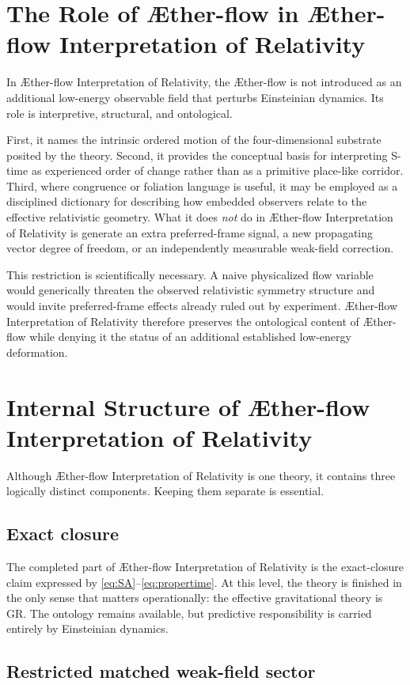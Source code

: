 \documentclass[11pt]{article}
\newcommand{\Aflow}{\AE{}ther-flow}
\newcommand{\TheoryName}{\Aflow{} Interpretation of Relativity}
\begin{document}
\section{The Role of \Aflow{} in \TheoryName{}}

In \TheoryName{}, the \Aflow{} is not introduced as an additional low-energy observable field that perturbs Einsteinian dynamics. Its role is interpretive, structural, and ontological.

First, it names the intrinsic ordered motion of the four-dimensional substrate posited by the theory. Second, it provides the conceptual basis for interpreting S-time as experienced order of change rather than as a primitive place-like corridor. Third, where congruence or foliation language is useful, it may be employed as a disciplined dictionary for describing how embedded observers relate to the effective relativistic geometry. What it does \emph{not} do in \TheoryName{} is generate an extra preferred-frame signal, a new propagating vector degree of freedom, or an independently measurable weak-field correction.

This restriction is scientifically necessary. A naive physicalized flow variable would generically threaten the observed relativistic symmetry structure and would invite preferred-frame effects already ruled out by experiment. \TheoryName{} therefore preserves the ontological content of \Aflow{} while denying it the status of an additional established low-energy deformation.

\section{Internal Structure of \TheoryName{}}

Although \TheoryName{} is one theory, it contains three logically distinct components. Keeping them separate is essential.

\subsection{Exact closure}

The completed part of \TheoryName{} is the exact-closure claim expressed by \eqref{eq:SA}--\eqref{eq:propertime}. At this level, the theory is finished in the only sense that matters operationally: the effective gravitational theory is GR. The ontology remains available, but predictive responsibility is carried entirely by Einsteinian dynamics.

\subsection{Restricted matched weak-field sector}
\end{document}
